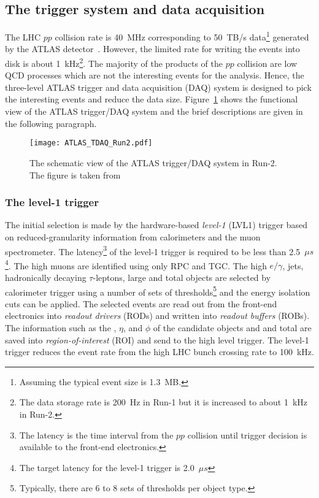 
\subsection{The trigger system and data acquisition}
\label{subsec:ae_trigger}
The LHC $pp$ collision rate is 40~MHz corresponding to 50~TB/s data\footnote{Assuming the typical event size is 1.3~MB.} generated by the ATLAS detector~\cite{Kordas:2007zz}.
However, the limited rate for writing the events into disk is about 1~kHz\footnote{The data storage rate is 200~Hz in Run-1 but it is increased to about 1~kHz in Run-2.}.
The majority of the products of the $pp$ collision are low \pt QCD processes which are not the interesting events for the analysis.  
Hence, the three-level ATLAS trigger and data acquisition (DAQ) system is designed to pick the interesting events and reduce the data size.
Figure~\ref{fig:ae_tdaq} shows the functional view of the ATLAS trigger/DAQ system and the brief descriptions are given in the following paragraph.

\begin{figure}[htbp]
\begin{center}
\texttt{[image: ATLAS\_TDAQ\_Run2.pdf]}
\caption{The schematic view of the ATLAS trigger/DAQ system in Run-2.
The figure is taken from~\cite{Martinez:2016udm}}
\label{fig:ae_tdaq}
\end{center}
\end{figure}


\subsubsection{The level-1 trigger}
\label{subsubsec:ae_LVL1}
The initial selection is made by the hardware-based \textit{level-1} (LVL1) trigger based on reduced-granularity information from calorimeters and the muon spectrometer.
The latency\footnote{The latency is the time interval from the $pp$ collision until trigger decision is available to the front-end electronics.} of the level-1 trigger is required to be less than 2.5~$\mu s$\footnote{The target latency for the level-1 trigger is 2.0~$\mu s$}.
The high \pt muons are identified using only RPC and TGC.
The high \pt $e/\gamma$, jets, hadronically decaying $\tau$-leptons, large \met and total \et objects are selected by calorimeter trigger using a number of sets of \pt thresholds\footnote{Typically, there are 6 to 8 sets of thresholds per object type.} and the energy isolation cuts can be applied. 
The selected events are read out from the front-end electronics into \textit{readout drivers} (RODs) and written into \textit{readout buffers} (ROBs).
The information such as the \pt, $\eta$, and $\phi$ of the candidate objects and \met and total \et are saved into \textit{region-of-interest} (ROI) and send to the high level trigger.
The level-1 trigger reduces the event rate from the high LHC bunch crossing rate to 100~kHz.

